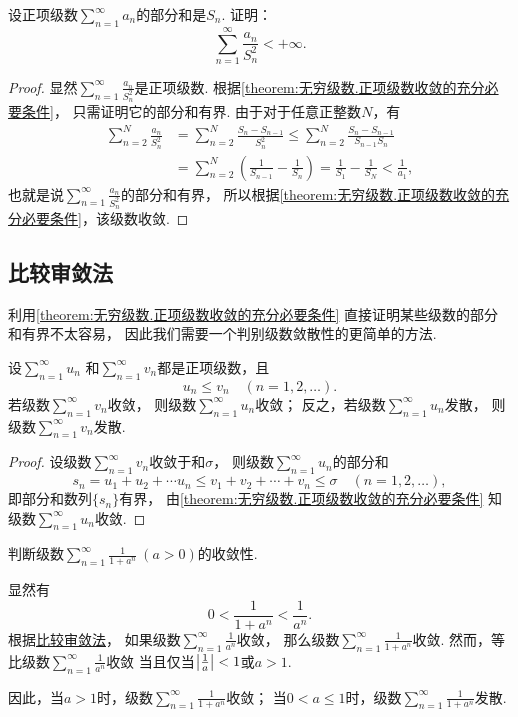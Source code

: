 \begin{example}
设正项级数\(\sum_{n=1}^\infty a_n\)的部分和是\(S_n\).
证明：\[
	\sum_{n=1}^\infty \frac{a_n}{S_n^2} < +\infty.
\]
\begin{proof}
显然\(\sum_{n=1}^\infty \frac{a_n}{S_n^2}\)是正项级数.
根据\cref{theorem:无穷级数.正项级数收敛的充分必要条件}，
只需证明它的部分和有界.
由于对于任意正整数\(N\)，有\begin{align*}
	\sum_{n=2}^N \frac{a_n}{S_n^2}
	&= \sum_{n=2}^N \frac{S_n-S_{n-1}}{S_n^2}
	\leq \sum_{n=2}^N \frac{S_n-S_{n-1}}{S_{n-1} S_n} \\
	&= \sum_{n=2}^N \left(
			\frac{1}{S_{n-1}} - \frac{1}{S_n}
		\right)
	= \frac{1}{S_1} - \frac{1}{S_N}
	< \frac{1}{a_1},
\end{align*}
也就是说\(\sum_{n=1}^\infty \frac{a_n}{S_n^2}\)的部分和有界，
所以根据\cref{theorem:无穷级数.正项级数收敛的充分必要条件}，该级数收敛.
\end{proof}
\end{example}

\subsection{比较审敛法}
利用\cref{theorem:无穷级数.正项级数收敛的充分必要条件} 直接证明某些级数的部分和有界不太容易，
因此我们需要一个判别级数敛散性的更简单的方法.

\begin{theorem}[比较审敛法]\label{theorem:无穷级数.正项级数的比较审敛法}
设\(\sum_{n=1}^\infty u_n\)
和\(\sum_{n=1}^\infty v_n\)都是正项级数，且\[
	u_n \leq v_n
	\quad(n=1,2,\dotsc).
\]
若级数\(\sum_{n=1}^\infty v_n\)收敛，
则级数\(\sum_{n=1}^\infty u_n\)收敛；
反之，若级数\(\sum_{n=1}^\infty u_n\)发散，
则级数\(\sum_{n=1}^\infty v_n\)发散.
\begin{proof}
设级数\(\sum_{n=1}^\infty v_n\)收敛于和\(\sigma\)，
则级数\(\sum_{n=1}^\infty u_n\)的部分和\[
	s_n = u_1 + u_2 + \dotsb u_n
	\leq
	v_1 + v_2 + \dotsb + v_n \leq \sigma
	\quad(n=1,2,\dotsc),
\]
即部分和数列\(\{s_n\}\)有界，
由\cref{theorem:无穷级数.正项级数收敛的充分必要条件} 知级数\(\sum_{n=1}^\infty u_n\)收敛.
\end{proof}
\end{theorem}

\begin{example}
判断级数\(\sum_{n=1}^\infty \frac{1}{1+a^n}\ (a>0)\)的收敛性.
\begin{solution}
显然有\[
	0 < \frac{1}{1+a^n} < \frac{1}{a^n}.
\]
根据\hyperref[theorem:无穷级数.正项级数的比较审敛法]{比较审敛法}，
如果级数\(\sum_{n=1}^\infty \frac{1}{a^n}\)收敛，
那么级数\(\sum_{n=1}^\infty \frac{1}{1+a^n}\)收敛.
然而，等比级数\(\sum_{n=1}^\infty \frac{1}{a^n}\)收敛
当且仅当\(\abs{\frac{1}{a}} < 1\)或\(a > 1\).

因此，当\(a > 1\)时，级数\(\sum_{n=1}^\infty \frac{1}{1+a^n}\)收敛；
当\(0 < a \leq 1\)时，级数\(\sum_{n=1}^\infty \frac{1}{1+a^n}\)发散.
\end{solution}
\end{example}

